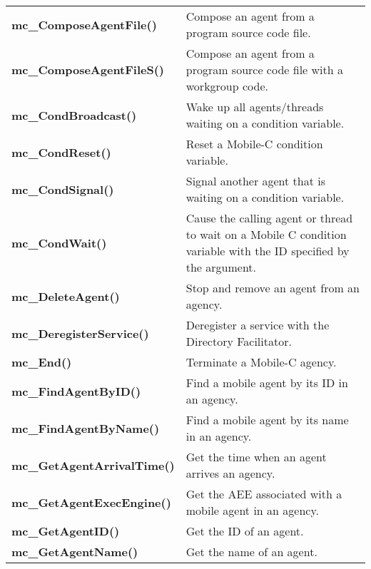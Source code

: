 \begin{table}[!h]
\begin{center}
\begin{tabular}{p{63 mm}p{97 mm}}
{\bf mc\_ComposeAgentFile()} & Compose an agent from a program source code file. \\
{\bf mc\_ComposeAgentFileS()} & Compose an agent from a program source code file with a workgroup code. \\
{\bf mc\_CondBroadcast()} & Wake up all agents/threads waiting on a condition variable. \\
{\bf mc\_CondReset()} & Reset a Mobile-C condition variable. \\
{\bf mc\_CondSignal()} & Signal another agent that is waiting on a condition variable. \\
{\bf mc\_CondWait()} & Cause the calling agent or thread to wait on a Mobile C condition variable with the ID specified by the argument. \\
{\bf mc\_DeleteAgent()} & Stop and remove an agent from an agency. \\
{\bf mc\_DeregisterService()} & Deregister a service with the Directory Facilitator. \\
{\bf mc\_End()} & Terminate a Mobile-C agency. \\
{\bf mc\_FindAgentByID()} & Find a mobile agent by its ID in an agency. \\
{\bf mc\_FindAgentByName()} & Find a mobile agent by its name in an agency. \\
{\bf mc\_GetAgentArrivalTime()} & Get the time when an agent arrives an agency. \\
{\bf mc\_GetAgentExecEngine()} & Get the AEE associated with a mobile agent in an agency. \\
{\bf mc\_GetAgentID()} & Get the ID of an agent. \\
{\bf mc\_GetAgentName()} & Get the name of an agent. \\
\hline
\end{tabular}
\end{center}
\label{chmobilec_api_cscript}
\end{table}
\pagebreak


